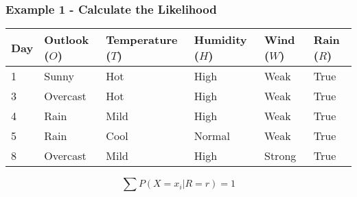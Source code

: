 \documentclass[aspectratio=169, 10pt]{beamer}
\begin{document}
\begin{frame}[t]
    \frametitle{Example 1 - Calculate the Likelihood}
    \begin{table}[]
        \small
        \begin{tabular}{l|llll|l}
        \textbf{Day} & \textbf{Outlook} ($O$) & \textbf{Temperature} ($T$) & \textbf{Humidity} ($H$) & \textbf{Wind} ($W$) & \textbf{Rain} ($R$) \\ \hline
        1            & Sunny            & Hot                  & High              & Weak          & True           \\
        3            & Overcast         & Hot                  & High              & Weak          & True           \\
        4            & Rain             & Mild                 & High              & Weak          & True           \\
        5            & Rain             & Cool                 & Normal            & Weak          & True           \\
        8            & Overcast         & Mild                 & High              & Strong        & True           \\
        \end{tabular}
    \end{table}

    $$\sum P(X=x_i| R=r) = 1$$


\end{frame}
\end{document}
